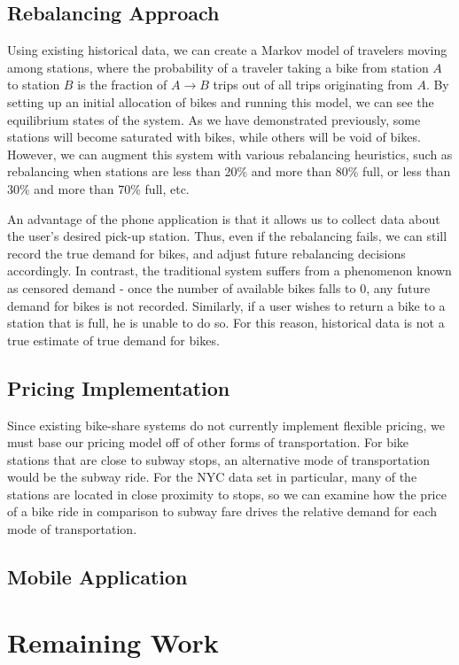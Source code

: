 \documentclass{sig-alternate}
\begin{document}
\subsection{Rebalancing Approach}
Using existing historical data, we can create a Markov model of travelers moving among stations, where the probability of a traveler taking a bike from station $A$ to station $B$ is the fraction of $A \rightarrow B$ trips out of all trips originating from $A$.  By setting up an initial allocation of bikes and running this model, we can see the equilibrium states of the system.  As we have demonstrated previously, some stations will become saturated with bikes, while others will be void of bikes.  However, we can augment this system with various rebalancing heuristics, such as rebalancing when stations are less than 20\% and more than 80\% full, or less than 30\% and more than 70\% full, etc. \newline

An advantage of the phone application is that it allows us to collect data about the user's desired pick-up station.  Thus, even if the rebalancing fails, we can still record the true demand for bikes, and adjust future rebalancing decisions accordingly.  In contrast, the traditional system suffers from a phenomenon known as censored demand - once the number of available bikes falls to 0, any future demand for bikes is not recorded.  Similarly, if a user wishes to return a bike to a station that is full, he is unable to do so.  For this reason, historical data is not a true estimate of true demand for bikes.

\subsection{Pricing Implementation}
Since existing bike-share systems do not currently implement flexible pricing, we must base our pricing model off of other forms of transportation.  For bike stations that are close to subway stops, an alternative mode of transportation would be the subway ride.  For the NYC data set in particular, many of the stations are located in close proximity to stops, so we can examine how the price of a bike ride in comparison to subway fare drives the relative demand for each mode of transportation.
\subsection{Mobile Application}

\section{Remaining Work}
\end{document}
